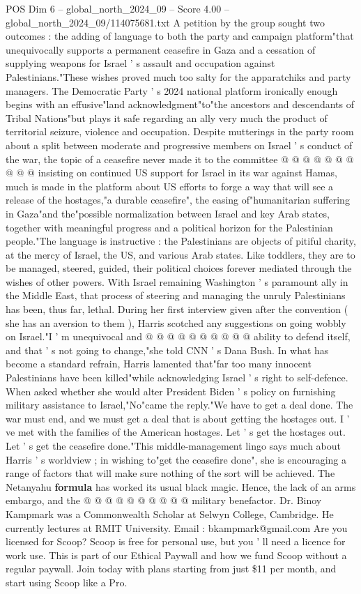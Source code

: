 \begin{textsample}{POS Dim 6 – global\_north\_2024\_09 – Score 4.00 – global\_north\_2024\_09/114075681.txt}
A petition by the group sought two outcomes : the adding of language to both the party and campaign platform"that unequivocally supports a permanent ceasefire in Gaza and a cessation of supplying weapons for Israel ' s assault and occupation against Palestinians."These wishes proved much too salty for the apparatchiks and party managers.
The Democratic Party ' s 2024 national platform ironically enough begins with an effusive"land acknowledgment"to"the ancestors and descendants of Tribal Nations"but plays it safe regarding an ally very much the product of territorial seizure, violence and occupation.
Despite mutterings in the party room about a split between moderate and progressive members on Israel ' s conduct of the war, the topic of a ceasefire never made it to the committee @ @ @ @ @ @ @ @ @ @ insisting on continued US support for Israel in its war against Hamas, much is made in the platform about US efforts to forge a way that will see a release of the hostages,"a durable ceasefire", the easing of"humanitarian suffering in Gaza"and the"possible normalization between Israel and key Arab states, together with meaningful progress and a political horizon for the Palestinian people."The language is instructive : the Palestinians are objects of pitiful charity, at the mercy of Israel, the US, and various Arab states.
Like toddlers, they are to be managed, steered, guided, their political choices forever mediated through the wishes of other powers.
With Israel remaining Washington ' s paramount ally in the Middle East, that process of steering and managing the unruly Palestinians has been, thus far, lethal.
During her first interview given after the convention ( she has an aversion to them ), Harris scotched any suggestions on going wobbly on Israel."I ' m unequivocal and @ @ @ @ @ @ @ @ @ @ ability to defend itself, and that ' s not going to change,"she told CNN ' s Dana Bush.
In what has become a standard refrain, Harris lamented that"far too many innocent Palestinians have been killed"while acknowledging Israel ' s right to self-defence.
When asked whether she would alter President Biden ' s policy on furnishing military assistance to Israel,"No"came the reply."We have to get a deal done.
The war must end, and we must get a deal that is about getting the hostages out.
I ' ve met with the families of the American hostages.
Let ' s get the hostages out.
Let ' s get the ceasefire done."This middle-management lingo says much about Harris ' s worldview ; in wishing to"get the ceasefire done", she is encouraging a range of factors that will make sure nothing of the sort will be achieved.
The Netanyahu \textbf{formula} has worked its usual black magic.
Hence, the lack of an arms embargo, and the @ @ @ @ @ @ @ @ @ @ military benefactor.
Dr.
Binoy Kampmark was a Commonwealth Scholar at Selwyn College, Cambridge.
He currently lectures at RMIT University.
Email : bkampmark@gmail.com Are you licensed for Scoop?
Scoop is free for personal use, but you ' ll need a licence for work use.
This is part of our Ethical Paywall and how we fund Scoop without a regular paywall.
Join today with plans starting from just \$11 per month, and start using Scoop like a Pro.


\end{textsample}
